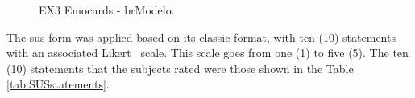 \begin{figure}[!htb]
    \centering
    \caption{EX3 Emocards - brModelo.}
    \label{fig:Emocards3_alt}
    
\end{figure}

The \ac{sus} form was applied based on its classic format, with ten (10) statements with an associated Likert~\cite{Likert} scale.
This scale goes from one (1) to five (5).
The ten (10) statements that the subjects rated were those shown in the Table \ref{tab:SUSstatements}.



